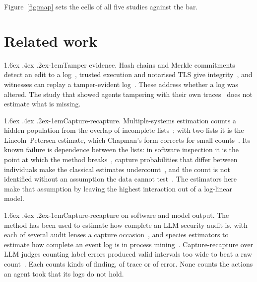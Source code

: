 \documentclass[11pt]{article}
\makeatletter
\renewcommand\paragraph{\@startsection{paragraph}{4}{\z@}%
  {1.6ex \@plus .4ex \@minus .2ex}{-1em}{\normalfont\normalsize\bfseries}}
\makeatother
\begin{document}
Figure~\ref{fig:map} sets the cells of all five studies against the bar.

\section{Related work}
\label{sec:related}

\paragraph{Tamper evidence.} Hash chains and Merkle commitments detect an edit to a
log~\citep{flightrecorder2026}, trusted execution and notarised TLS give
integrity~\citep{vet2025}, and witnesses can replay a tamper-evident
log~\citep{haeberlen2007peerreview}. These address whether a log was altered. The study
that showed agents tampering with their own traces~\citep{qin2026tamper} does not
estimate what is missing.

\paragraph{Capture-recapture.} Multiple-systems estimation counts a hidden population
from the overlap of incomplete lists~\citep{fienberg1972,bird2018mse}; with two lists it
is the Lincoln--Petersen estimate, which Chapman's form corrects for small
counts~\citep{chapman1951}. Its known
failure is dependence between the lists: in software inspection it is the point at
which the method breaks~\citep{eick1992inspection,petersson2004inspection}, capture
probabilities that differ between individuals make the classical estimates
undercount~\citep{chao1987}, and the count is not identified without an assumption the
data cannot test~\citep{aleshinguendel2024}. The estimators here make that assumption by
leaving the highest interaction out of a log-linear model.

\paragraph{Capture-recapture on software and model output.} The method has been used to
estimate how complete an LLM security audit is, with each of several audit lenses a
capture occasion~\citep{hirashima2026vsat}, and species estimators to estimate how complete an
event log is in process mining~\citep{yang2012completeness}. Capture-recapture over LLM
judges counting label errors produced valid intervals too wide to beat a raw
count~\citep{kansal2026labels}. Each counts kinds of finding, of trace or of error. None
counts the actions an agent took that its logs do not hold.
\end{document}
